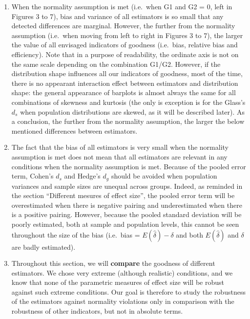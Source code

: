 \documentclass[
  man,floatsintext]{apa6}
\begin{document}
\begin{enumerate}
\def\labelenumi{\arabic{enumi})}
\item
  When the normality assumption is met (i.e.~when G1 and G2 = 0, left in Figures 3 to 7), bias and variance of all estimators is so small that any detected differences are marginal. However, the further from the normality assumption (i.e.~when moving from left to right in Figures 3 to 7), the larger the value of all envisaged indicators of goodness (i.e.~bias, relative bias and efficiency). Note that in a purpose of readability, the ordinate axis is not on the same scale depending on the combination G1/G2. However, if the distribution shape influences all our indicators of goodness, most of the time, there is no appearant interaction effect between estimators and distribution shape: the general appearance of barplots is almost always the same for all combinations of skewness and kurtosis (the only is exception is for the Glass's \(d_s\) when population distributions are skewed, as it will be described later). As a conclusion, the further from the normality assumption, the larger the below mentioned differences between estimators.
\item
  The fact that the bias of all estimators is very small when the normality assumption is met does not mean that all estimators are relevant in any conditions when the normality assumption is met. Because of the pooled error term, Cohen's \(d_s\) and Hedge's \(d_g\) should be avoided when population variances and sample sizes are unequal across groups. Indeed, as reminded in the section \enquote{Different mesures of effect size}, the pooled error term will be overestimated when there is negative pairing and underestimated when there is a positive pairing. However, because the pooled standard deviation will be poorly estimated, both at sample and population levels, this cannot be seen throughout the size of the bias (i.e.~bias = \(E(\hat{\delta})-\delta\) and both \(E(\hat{\delta})\) and \(\delta\) are badly estimated).
\item
  Throughout this section, we will \textbf{compare} the goodness of different estimators. We chose very extreme (although realistic) conditions, and we know that none of the parametric measures of effect size will be robust against such extreme conditions. Our goal is therefore to study the robustness of the estimators against normality violations only in comparison with the robustness of other indicators, but not in absolute terms.
\end{enumerate}
\end{document}
